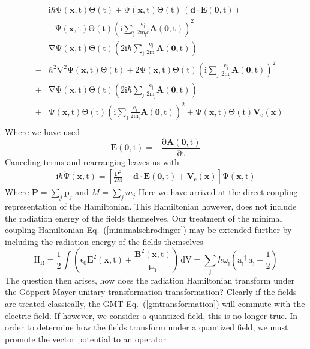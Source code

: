 \begin{eqnarray}
&&\mathrm{\mathrm{i}\mathrm{\hbar}\dot{\Psi}(\mathbf{x},t)\Theta(t)+\Psi(\mathbf{x},t)\Theta(t)\,\left(\mathbf{d}\cdot\mathbf{E}(\mathbf{0},t)\right)=}\nonumber \\
&&\mathrm{-\Psi(\mathbf{x},t)\Theta(t)\left(i\sum_j\frac{e_j}{2m_jc}\mathbf{A}(\mathbf{0},t)\right)^2}\nonumber \\
&-&\mathrm{\nabla\Psi(\mathbf{x},t)\Theta(t)\left(2i\hbar\sum_j\frac{e_j}{2m_j}\mathbf{A}(\mathbf{0},t)\right)}\nonumber \\
&-&\mathrm{\hbar^2\nabla^2\Psi(\mathbf{x},t)\Theta(t)+2\Psi(\mathbf{x},t)\Theta(t)\left(i\sum_j\frac{e_j}{2m_j}\mathbf{A}(\mathbf{0},t)\right)^2}\nonumber \\
&+&\mathrm{\nabla\Psi(\mathbf{x},t)\Theta(t)\left(2i\hbar\sum_j\frac{e_j}{2m_j}\mathbf{A}(\mathbf{0},t)\right)}\nonumber \\
&+&\mathrm{\Psi(\mathbf{x},t)\Theta(t)\left(i\sum_j\frac{e_j}{2m_j}\mathbf{A}(\mathbf{0},t)\right)^2 +\Psi(\mathbf{x},t)\Theta(t)\mathbf{V}_c(\mathbf{x})}\nonumber \\
\end{eqnarray}
Where we have used 
\begin{equation}
\mathrm{\mathbf{E}(\mathbf{0},t)=-\frac{\partial \mathbf{A}(\mathbf{0},t)}{\partial t}}
\label{constitutive1}
\end{equation}
Canceling terms and rearranging leaves us with
\begin{eqnarray}
\mathrm{i\hbar\dot{\Psi}(\mathbf{x},t)=\left[\frac{\mathbf{P}^2}{2M}-\mathbf{d}\cdot\mathbf{E}(\mathbf{0},t)+\mathbf{V}_c(\mathbf{x})\right]\Psi(\mathbf{x},t)}
\label{directschrodinger}
\end{eqnarray}
Where $\mathbf{P}=\sum_j\mathbf{p}_j$ and $M=\sum_j m_j$
Here we have arrived at the direct coupling representation of the Hamiltonian. This Hamiltonian however, does not include the radiation energy of the fields themselves. Our treatment of the minimal coupling Hamiltonian Eq.\ (\ref{minimalschrodinger}) may be extended further by including the radiation energy of the fields themselves
\begin{equation}
\mathrm{H_R=\frac{1}{2}\int\left( \epsilon_0\mathbf{E}^2(\mathbf{x},t)+\frac{\mathbf{B}^2(\mathbf{x},t)}{\mu_0}\right)\,dV=\sum_j\hbar\omega_j\left({a_j}^{\dagger}\, a_j+\frac{1}{2}\right)}
\end{equation}
The question then arises, how does the radiation Hamiltonian transform under the G\"{o}ppert-Mayer unitary transformation transformation? Clearly if the fields are treated classically, the GMT Eq.\ (\ref{gmtransformation}) will commute with the electric field.  If however, we consider a quantized field, this is no longer true. In order to determine how the fields transform under a quantized field, we must promote the vector potential to an operator \cite{thirunamachandran}
